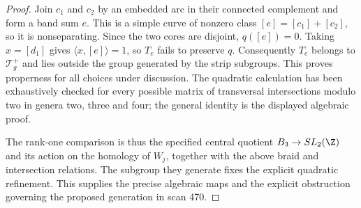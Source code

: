 \begin{proof}
Join $c_1$ and $c_2$ by an embedded arc in their connected complement
and form a band sum $e$. This is a simple curve of nonzero class
$[e]=[c_1]+[c_2]$, so it is nonseparating. Since the two cores are
disjoint, $q([e])=0$. Taking $x=[d_1]$ gives
$\langle x,[e]\rangle=1$, so $T_e$ fails to preserve $q$.
Consequently $T_e$ belongs to $\mathcal T_g^+$ and lies outside the
group generated by the strip subgroups. This proves properness for
all choices under discussion. The quadratic calculation has been
exhaustively checked for every possible matrix of transversal
intersections modulo two in genera two, three and four; the general
identity is the displayed algebraic proof.

The rank-one comparison is thus the specified central quotient
$B_3\to SL_2(\Z)$ and its action on the homology of $W_j$, together
with the above braid and intersection relations. The subgroup they
generate fixes the explicit quadratic refinement. This supplies the
precise algebraic maps and the explicit obstruction governing the
proposed generation in scan 470.
\end{proof}
